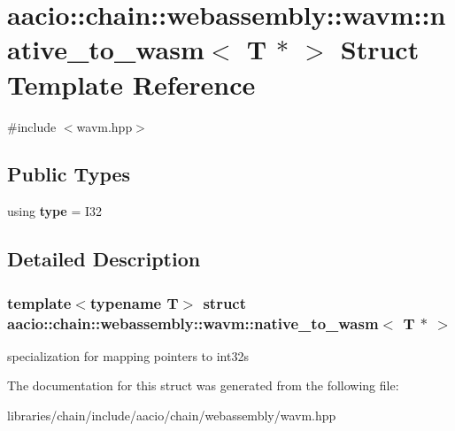 \hypertarget{structaacio_1_1chain_1_1webassembly_1_1wavm_1_1native__to__wasm_3_01_t_01_5_01_4}{}\section{aacio\+:\+:chain\+:\+:webassembly\+:\+:wavm\+:\+:native\+\_\+to\+\_\+wasm$<$ T $\ast$ $>$ Struct Template Reference}
\label{structaacio_1_1chain_1_1webassembly_1_1wavm_1_1native__to__wasm_3_01_t_01_5_01_4}


{\ttfamily \#include $<$wavm.\+hpp$>$}

\subsection*{Public Types}
\begin{DoxyCompactItemize}
\item 
\mbox{\label{structaacio_1_1chain_1_1webassembly_1_1wavm_1_1native__to__wasm_3_01_t_01_5_01_4_af920fd1e9095e7ba46ee8b5232419cb3}} 
using {\bfseries type} = I32
\end{DoxyCompactItemize}


\subsection{Detailed Description}
\subsubsection*{template$<$typename T$>$\newline
struct aacio\+::chain\+::webassembly\+::wavm\+::native\+\_\+to\+\_\+wasm$<$ T $\ast$ $>$}

specialization for mapping pointers to int32\textquotesingle{}s 

The documentation for this struct was generated from the following file\+:\begin{DoxyCompactItemize}
\item 
libraries/chain/include/aacio/chain/webassembly/wavm.\+hpp\end{DoxyCompactItemize}
